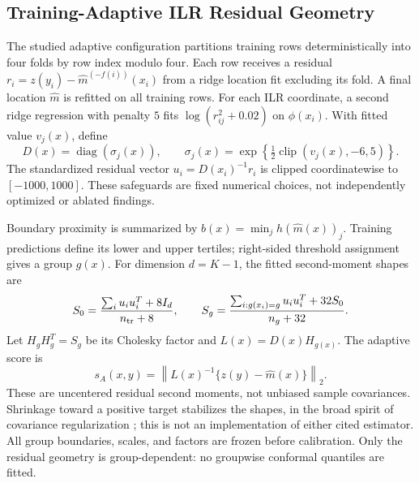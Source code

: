 \documentclass{article}
\newcommand{\clip}{\operatorname{clip}}
\begin{document}
\subsection{Training-Adaptive ILR Residual Geometry}
The studied adaptive configuration partitions training rows deterministically into four folds by row index modulo four. Each row receives a residual $r_i=z(y_i)-\widehat m^{(-f(i))}(x_i)$ from a ridge location fit excluding its fold. A final location $\widehat m$ is refitted on all training rows. For each ILR coordinate, a second ridge regression with penalty $5$ fits $\log(r_{ij}^2+0.02)$ on $\phi(x_i)$. With fitted value $v_j(x)$, define
\begin{equation}
 D(x)=\operatorname{diag}(\sigma_j(x)),\qquad
 \sigma_j(x)=\exp\!\left\{\tfrac12\clip(v_j(x),-6,5)\right\}.
 \label{eq:scale}
\end{equation}
The standardized residual vector $u_i=D(x_i)^{-1}r_i$ is clipped coordinatewise to $[-1000,1000]$. These safeguards are fixed numerical choices, not independently optimized or ablated findings.

Boundary proximity is summarized by $b(x)=\min_j h(\widehat m(x))_j$. Training predictions define its lower and upper tertiles; right-sided threshold assignment gives a group $g(x)$. For dimension $d=K-1$, the fitted second-moment shapes are
\begin{equation}
 S_0=\frac{\sum_i u_i u_i^T+8I_d}{n_{\rm tr}+8},\qquad
 S_g=\frac{\sum_{i:g(x_i)=g}u_i u_i^T+32S_0}{n_g+32}.
 \label{eq:shape}
\end{equation}
Let $H_gH_g^T=S_g$ be its Cholesky factor and $L(x)=D(x)H_{g(x)}$. The adaptive score is
\begin{equation}
 s_A(x,y)=\left\|L(x)^{-1}\{z(y)-\widehat m(x)\}\right\|_2.
 \label{eq:score}
\end{equation}
These are uncentered residual second moments, not unbiased sample covariances. Shrinkage toward a positive target stabilizes the shapes, in the broad spirit of covariance regularization \citep{SchaferStrimmer2005,Chen2010}; this is not an implementation of either cited estimator. All group boundaries, scales, and factors are frozen before calibration. Only the residual geometry is group-dependent: no groupwise conformal quantiles are fitted.
\end{document}
